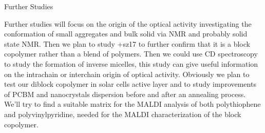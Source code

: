 \clearpage
\begin{section}{Further Studies}

Further studies will focus on the origin of the optical activity investigating the conformation of small aggregates and bulk solid via \gls{NMR} and probably solid state \gls{NMR}.  
Then we plan to study \cmpd+{sz17} to further confirm that it is a block copolymer rather than a blend of polymers. Then we could use \gls{CD} spectroscopy to study the formation of inverse micelles, this study can give useful information on the intra\-chain or inter\-chain origin of optical activity. 
Obviously we plan to test our diblock copolymer in solar cells active layer and to study improvements of \gls{PCBM} and nano\-crystals dispersion before and after an annealing process. We'll try to find a suitable matrix for the \gls{MALDI} analysis of both polythiophene and polyvinylpyridine, needed for the \gls{MALDI} characterization of the block copolymer. 

\end{section}